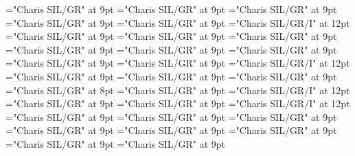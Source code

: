 \documentclass[gps1,twoside]{article}
\begin{document}
\font\spanspanslotsmorphosyntaxanalysissharedgrammaticalinfosensesentrybefore="Charis SIL/GR" at 9pt
\font\slotsmorphosyntaxanalysissharedgrammaticalinfosensesentrybefore="Charis SIL/GR" at 9pt
\font\spanspannameslotslotsmorphosyntaxanalysissharedgrammaticalinfosensesentrybefore="Charis SIL/GR" at 9pt
\font\spannameslotslotsmorphosyntaxanalysissharedgrammaticalinfosensesentrylastchildafter="Charis SIL/GR" at 9pt
\font\morphosyntaxanalysissensesensesentryafter="Charis SIL/GR" at 9pt
\font\morphosyntaxanalysissensesensesentry="Charis SIL/GR/I" at 12pt
\font\spanspanpartofspeechmorphosyntaxanalysissensesensesentrybefore="Charis SIL/GR" at 9pt
\font\spanpartofspeechmorphosyntaxanalysissensesensesentrylastchildafter="Charis SIL/GR" at 9pt
\font\spanspanslotsmorphosyntaxanalysissensesensesentrybefore="Charis SIL/GR" at 9pt
\font\slotsmorphosyntaxanalysissensesensesentrybefore="Charis SIL/GR" at 9pt
\font\spanspannameslotslotsmorphosyntaxanalysissensesensesentrybefore="Charis SIL/GR" at 9pt
\font\spannameslotslotsmorphosyntaxanalysissensesensesentrylastchildafter="Charis SIL/GR" at 9pt
\font\sensetypesensesensesentrybefore="Charis SIL/GR" at 9pt
\font\sensetypesensesensesentryafter="Charis SIL/GR" at 9pt
\font\sensetypesensesensesentry="Charis SIL/GR/I" at 12pt
\font\spanspanabbreviationsensetypesensesensesentrybefore="Charis SIL/GR" at 9pt
\font\spanspandefinitionorglosssensesensesentrybefore="Charis SIL/GR" at 9pt
\font\spandefinitionorglosssensesensesentrylastchildafter="Charis SIL/GR" at 9pt
\font\exampleexampleexamplessensesensesentrybefore="Charis SIL/GR" at 8pt
\font\examplessensesensesentryafter="Charis SIL/GR" at 9pt
\font\spanbzhexampleexampleexamplessensesensesentry="Charis SIL/GR/I" at 12pt
\font\spanspanexampleexampleexamplessensesensesentrybefore="Charis SIL/GR" at 9pt
\font\spanexampleexampleexamplessensesensesentrylastchildafter="Charis SIL/GR" at 9pt
\font\spanexampleexampleexamplessensesensesentry="Charis SIL/GR/I" at 12pt
\font\spanspantranslationtranslationtranslationsexampleexamplessensesensesentrybefore="Charis SIL/GR" at 9pt
\font\spantranslationtranslationtranslationsexampleexamplessensesensesentrylastchildafter="Charis SIL/GR" at 9pt
\font\spanspanencyclopedicinfosensesensesentrybefore="Charis SIL/GR" at 9pt
\font\spanencyclopedicinfosensesensesentryfirstchildbefore="Charis SIL/GR" at 9pt
\font\spanencyclopedicinfosensesensesentrylastchildafter="Charis SIL/GR" at 9pt
\font\spanspanrestrictionssensesensesentrybefore="Charis SIL/GR" at 9pt
\font\spanrestrictionssensesensesentryfirstchildbefore="Charis SIL/GR" at 9pt
\font\spanrestrictionssensesensesentrylastchildafter="Charis SIL/GR" at 9pt
\end{document}
